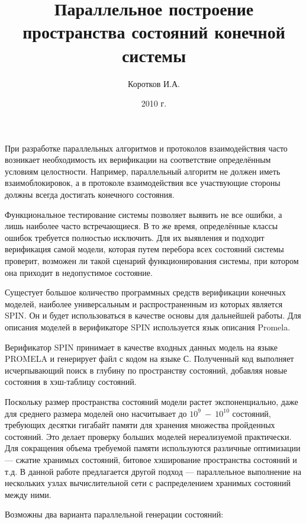 \documentclass[a4paper,12pt,notitlepage]{article}
\title{Параллельное построение пространства состояний конечной системы}
\author{Коротков И.А.}
\date{2010 г.}
\begin{document}
\maketitle

При разработке параллельных алгоритмов и протоколов взаимодействия
часто возникает необходимость их верификации на соответствие
определённым условиям целостности. Например, параллельный алгоритм
не должен иметь взаимоблокировок, а в протоколе взаимодействия все
участвующие стороны должны всегда достигать конечного состояния.

Функциональное тестирование системы позволяет выявить не все ошибки, а
лишь наиболее часто встречающиеся. В то же время, определённые классы
ошибок требуется полностью исключить. Для их выявления и
подходит верификация самой модели, которая путем перебора всех
состояний системы проверит, возможен ли такой сценарий
функционирования системы, при котором она приходит в недопустимое
состояние.

Сущестует большое количество программных средств верификации конечных
моделей, наиболее универсальным и распространенным из которых является
SPIN. Он и будет использоваться в качестве основы для дальнейшей
работы. Для описания моделей в верификаторе SPIN используется язык
описания Promela.

Верификатор SPIN принимает в качестве входных данных модель на языке
PROMELA и генерирует файл с кодом на языке С. Полученный код выполняет
исчерпывающий поиск в глубину по пространству состояний, добавляя
новые состояния в хэш-таблицу состояний. 

Поскольку размер пространства состояний модели растет экспоненциально,
даже для среднего размера моделей оно насчитывает до $10^9~-~10^{10}$
состояний, требующих десятки гигабайт памяти для хранения множества
пройденных состояний. Это делает проверку больших моделей
нереализуемой практически. Для сокращения объема требуемой памяти
используются различные оптимизации — сжатие хранимых состояний,
битовое хэширование пространства состояний и т.д. В данной работе
предлагается другой подход — параллельное выполнение на нескольких
узлах вычислительной сети с распределением хранимых состояний между
ними.

Возможны два варианта параллельной генерации состояний:
\end{document}
